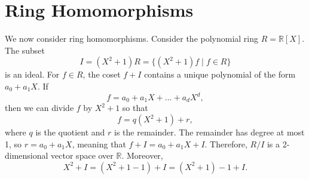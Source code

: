 \documentclass[a4paper, openany]{memoir}
\theoremstyle{definition}
\theoremstyle{plain}
\begin{document}
\newpage

\section{Ring Homomorphisms}
We now consider ring homomorphisms. Consider the polynomial ring $R = \mathbb{R}[X]$. The subset
\[I = (X^2 + 1)R = \{(X^2 + 1) f \mid f \in R\}\]
is an ideal. For $f \in R$, the coset $f + I$ contains a unique polynomial of the form $a_0 + a_1X$. If
\[f = a_0 + a_1X + \dots + a_d X^d,\]
then we can divide $f$ by $X^2 + 1$ so that
\[f = q(X^2 + 1) + r,\]
where $q$ is the quotient and $r$ is the remainder. The remainder has degree at most 1, so $r = a_0 + a_1X$, meaning that $f + I = a_0 + a_1X + I$. Therefore, $R/I$ is a 2-dimensional vector space over $\mathbb{R}$. Moreover,
\[X^2 + I = (X^2 + 1 - 1) + I = (X^2 + 1) -1 + I.\]
\end{document}
